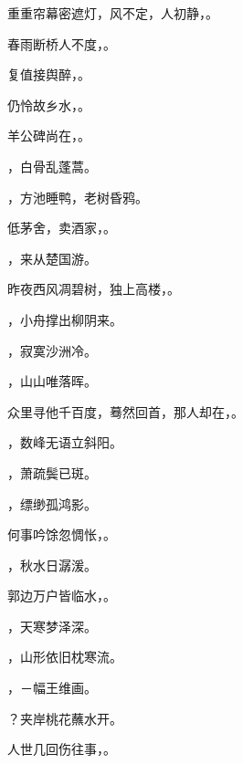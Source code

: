 \documentclass[12pt, a4paper, addpoints]{exam}
\begin{document}
\begin{questions}
\question[2] 重重帘幕密遮灯，风不定，人初静，\uline{\qquad\qquad\qquad\qquad}。

\question[2] 春雨断桥人不度，\uline{\qquad\qquad\qquad\qquad}。

\question[2] 复值接舆醉，\uline{\qquad\qquad\qquad\qquad}。

\question[2] 仍怜故乡水，\uline{\qquad\qquad\qquad\qquad}。

\question[2] 羊公碑尚在，\uline{\qquad\qquad\qquad\qquad}。

\question[2] \uline{\qquad\qquad\qquad\qquad}，白骨乱蓬蒿。

\question[2] \uline{\qquad\qquad\qquad\qquad}，方池睡鸭，老树昏鸦。

\question[2] 低茅舍，卖酒家，\uline{\qquad\qquad\qquad\qquad}。

\question[2] \uline{\qquad\qquad\qquad\qquad}，来从楚国游。

\question[2] 昨夜西风凋碧树，独上高楼，\uline{\qquad\qquad\qquad\qquad}。

\question[2] \uline{\qquad\qquad\qquad\qquad}，小舟撑出柳阴来。

\question[2] \uline{\qquad\qquad\qquad\qquad}，寂寞沙洲冷。

\question[2] \uline{\qquad\qquad\qquad\qquad}，山山唯落晖。

\question[2] 众里寻他千百度，蓦然回首，那人却在，\uline{\qquad\qquad\qquad\qquad}。

\question[2] \uline{\qquad\qquad\qquad\qquad}，数峰无语立斜阳。

\question[1] \uline{\qquad\qquad\qquad\qquad}，萧疏鬓已斑。

\question[2] \uline{\qquad\qquad\qquad\qquad}，缥缈孤鸿影。

\question[2] 何事吟馀忽惆怅，\uline{\qquad\qquad\qquad\qquad}。

\question[2] \uline{\qquad\qquad\qquad\qquad}，秋水日潺湲。

\question[2] 郭边万户皆临水，\uline{\qquad\qquad\qquad\qquad}。

\question[2] \uline{\qquad\qquad\qquad\qquad}，天寒梦泽深。

\question[2] \uline{\qquad\qquad\qquad\qquad}，山形依旧枕寒流。

\question[2] \uline{\qquad\qquad\qquad\qquad}，－幅王维画。

\question[2] \uline{\qquad\qquad\qquad\qquad}？夹岸桃花蘸水开。

\question[2] 人世几回伤往事，\uline{\qquad\qquad\qquad\qquad}。


\end{questions}
\end{document}
